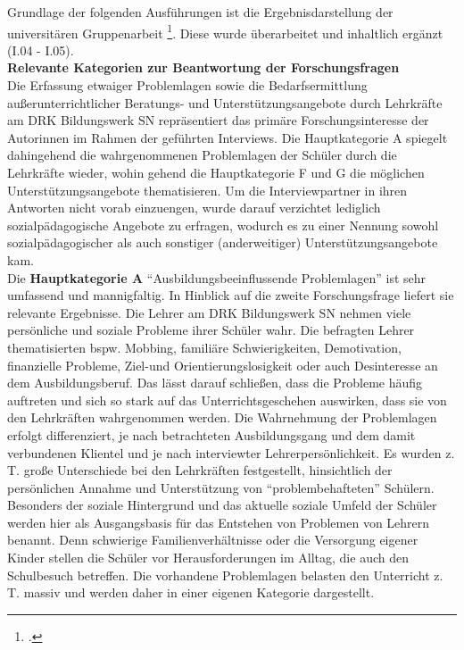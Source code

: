 \noindent
Grundlage der folgenden Ausführungen ist die Ergebnisdarstellung der universitären Gruppenarbeit \footcite[vgl.]{Hemmerling2015}. Diese wurde überarbeitet und inhaltlich ergänzt (I.04 - I.05).\\

\noindent
\textbf{Relevante Kategorien zur Beantwortung der Forschungsfragen}\\

\noindent
Die Erfassung etwaiger Problemlagen sowie die Bedarfsermittlung außerunterrichtlicher Beratungs- und Unterstützungsangebote durch Lehrkräfte am DRK Bildungswerk SN repräsentiert das primäre Forschungsinteresse der Autorinnen im Rahmen der geführten Interviews. Die Hauptkategorie A spiegelt dahingehend die wahrgenommenen Problemlagen der Schüler durch die Lehrkräfte wieder, wohin gehend die Hauptkategorie F und G die möglichen Unterstützungsangebote thematisieren. Um die Interviewpartner in ihren Antworten nicht vorab einzuengen, wurde darauf verzichtet lediglich sozialpädagogische Angebote zu erfragen, wodurch es zu einer Nennung sowohl sozialpädagogischer als auch sonstiger (anderweitiger) Unterstützungsangebote kam.\\

\noindent
Die \textbf{Hauptkategorie A} "`Ausbildungsbeeinflussende Problemlagen"' ist sehr umfassend und mannigfaltig. In Hinblick auf die zweite Forschungsfrage liefert sie relevante Ergebnisse. Die Lehrer am DRK Bildungswerk SN nehmen viele persönliche und soziale Probleme ihrer Schüler wahr. Die befragten Lehrer thematisierten bspw. Mobbing, familiäre Schwierigkeiten, Demotivation, finanzielle Probleme, Ziel-und Orientierungslosigkeit oder auch Desinteresse an dem Ausbildungsberuf. Das lässt darauf schließen, dass die Probleme häufig auftreten und sich so stark auf das Unterrichtsgeschehen auswirken, dass sie von den Lehrkräften wahrgenommen werden. Die Wahrnehmung der Problemlagen erfolgt differenziert, je nach betrachteten Ausbildungsgang und dem damit verbundenen Klientel und je nach interviewter Lehrerpersönlichkeit. Es wurden z. T. große Unterschiede bei den Lehrkräften festgestellt, hinsichtlich der persönlichen Annahme und Unterstützung von "`problembehafteten"' Schülern. Besonders der soziale Hintergrund und das aktuelle soziale Umfeld der Schüler werden hier als Ausgangsbasis für das Entstehen von Problemen von Lehrern benannt. Denn schwierige Familienverhältnisse oder die Versorgung eigener Kinder stellen die Schüler vor Herausforderungen im Alltag, die auch den Schulbesuch betreffen. Die vorhandene Problemlagen belasten den Unterricht z. T. massiv und werden daher in einer eigenen Kategorie dargestellt.

